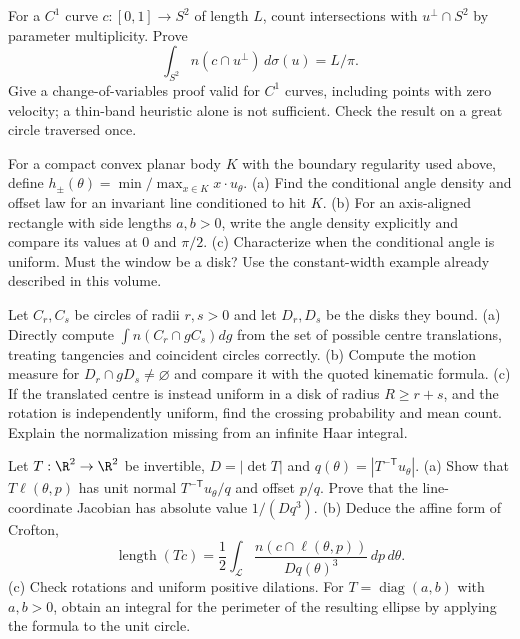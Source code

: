 \begin{exercise}[$\star\star$]\label{ex:spherecrofton}
For a $C^1$ curve $c:[0,1]\to S^2$ of length $L$, count intersections with $u^\perp\cap S^2$ by parameter multiplicity. Prove
\[
\int_{S^2}n(c\cap u^\perp)\,d\sigma(u)=L/\pi.
\]
Give a change-of-variables proof valid for $C^1$ curves, including points with zero velocity; a thin-band heuristic alone is not sufficient. Check the result on a great circle traversed once.
\end{exercise}

\begin{exercise}[$\star\star$]\label{ex:v9-ch11-window-law}
For a compact convex planar body $K$ with the boundary regularity used above, define $h_\pm(\theta)=\min/\max_{x\in K}x\cdot u_\theta$.
(a) Find the conditional angle density and offset law for an invariant line conditioned to hit $K$.
(b) For an axis-aligned rectangle with side lengths $a,b>0$, write the angle density explicitly and compare its values at $0$ and $\pi/2$.
(c) Characterize when the conditional angle is uniform. Must the window be a disk? Use the constant-width example already described in this volume.
\end{exercise}

\begin{exercise}[$\star\star$]\label{ex:v9-ch11-moving-circles}
Let $C_r,C_s$ be circles of radii $r,s>0$ and let $D_r,D_s$ be the disks they bound.
(a) Directly compute $\int n(C_r\cap gC_s)dg$ from the set of possible centre translations, treating tangencies and coincident circles correctly.
(b) Compute the motion measure for $D_r\cap gD_s\ne\varnothing$ and compare it with the quoted kinematic formula.
(c) If the translated centre is instead uniform in a disk of radius $R\ge r+s$, and the rotation is independently uniform, find the crossing probability and mean count. Explain the normalization missing from an infinite Haar integral.
\end{exercise}

\begin{exercise}[$\star\star\star$]\label{ex:v9-ch11-affine-crofton}
Let $T:\R^2\to\R^2$ be invertible, $D=|\det T|$ and $q(\theta)=|T^{-\mathsf T}u_\theta|$.
(a) Show that $T\ell(\theta,p)$ has unit normal $T^{-\mathsf T}u_\theta/q$ and offset $p/q$. Prove that the line-coordinate Jacobian has absolute value $1/(Dq^3)$.
(b) Deduce the affine form of Crofton,
\[
\operatorname{length}(Tc)=\frac12\int_{\mathcal L}
\frac{n(c\cap\ell(\theta,p))}{Dq(\theta)^3}\,dp\,d\theta.
\]
(c) Check rotations and uniform positive dilations. For $T=\operatorname{diag}(a,b)$ with $a,b>0$, obtain an integral for the perimeter of the resulting ellipse by applying the formula to the unit circle.
\end{exercise}

